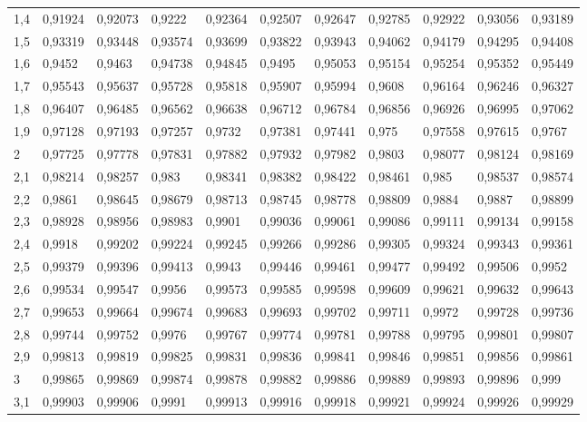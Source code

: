 \documentclass[addpoints,spanish, 12pt,a4paper]{exam}
\begin{document}
\begin{table}
\begin{tabular}{l|llllllllll}
1,4 & 0,91924 & 0,92073 & 0,9222  & 0,92364 & 0,92507 & 0,92647 & 0,92785 & 0,92922 & 0,93056 & 0,93189 \\
1,5 & 0,93319 & 0,93448 & 0,93574 & 0,93699 & 0,93822 & 0,93943 & 0,94062 & 0,94179 & 0,94295 & 0,94408 \\
1,6 & 0,9452  & 0,9463  & 0,94738 & 0,94845 & 0,9495  & 0,95053 & 0,95154 & 0,95254 & 0,95352 & 0,95449 \\
1,7 & 0,95543 & 0,95637 & 0,95728 & 0,95818 & 0,95907 & 0,95994 & 0,9608  & 0,96164 & 0,96246 & 0,96327 \\
1,8 & 0,96407 & 0,96485 & 0,96562 & 0,96638 & 0,96712 & 0,96784 & 0,96856 & 0,96926 & 0,96995 & 0,97062 \\
1,9 & 0,97128 & 0,97193 & 0,97257 & 0,9732  & 0,97381 & 0,97441 & 0,975   & 0,97558 & 0,97615 & 0,9767  \\
2   & 0,97725 & 0,97778 & 0,97831 & 0,97882 & 0,97932 & 0,97982 & 0,9803  & 0,98077 & 0,98124 & 0,98169 \\
2,1 & 0,98214 & 0,98257 & 0,983   & 0,98341 & 0,98382 & 0,98422 & 0,98461 & 0,985   & 0,98537 & 0,98574 \\
2,2 & 0,9861  & 0,98645 & 0,98679 & 0,98713 & 0,98745 & 0,98778 & 0,98809 & 0,9884  & 0,9887  & 0,98899 \\
2,3 & 0,98928 & 0,98956 & 0,98983 & 0,9901  & 0,99036 & 0,99061 & 0,99086 & 0,99111 & 0,99134 & 0,99158 \\
2,4 & 0,9918  & 0,99202 & 0,99224 & 0,99245 & 0,99266 & 0,99286 & 0,99305 & 0,99324 & 0,99343 & 0,99361 \\
2,5 & 0,99379 & 0,99396 & 0,99413 & 0,9943  & 0,99446 & 0,99461 & 0,99477 & 0,99492 & 0,99506 & 0,9952  \\
2,6 & 0,99534 & 0,99547 & 0,9956  & 0,99573 & 0,99585 & 0,99598 & 0,99609 & 0,99621 & 0,99632 & 0,99643 \\
2,7 & 0,99653 & 0,99664 & 0,99674 & 0,99683 & 0,99693 & 0,99702 & 0,99711 & 0,9972  & 0,99728 & 0,99736 \\
2,8 & 0,99744 & 0,99752 & 0,9976  & 0,99767 & 0,99774 & 0,99781 & 0,99788 & 0,99795 & 0,99801 & 0,99807 \\
2,9 & 0,99813 & 0,99819 & 0,99825 & 0,99831 & 0,99836 & 0,99841 & 0,99846 & 0,99851 & 0,99856 & 0,99861 \\
3   & 0,99865 & 0,99869 & 0,99874 & 0,99878 & 0,99882 & 0,99886 & 0,99889 & 0,99893 & 0,99896 & 0,999   \\
3,1 & 0,99903 & 0,99906 & 0,9991  & 0,99913 & 0,99916 & 0,99918 & 0,99921 & 0,99924 & 0,99926 & 0,99929 \\

\end{tabular}
\end{table}
\end{document}
